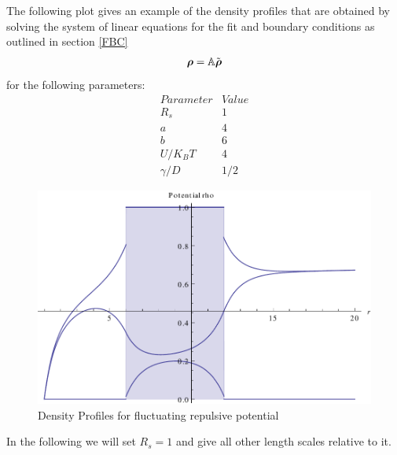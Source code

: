 The following plot gives an example of the density profiles that are obtained by solving the system of linear equations for the fit and boundary conditions as outlined in section \ref{FBC}
\begin{equation}
    \boldsymbol{\mathbf{\rho}} = \mathbb{A} \tilde{\boldsymbol{\mathbf{\rho}}}
\end{equation}
for the following parameters:
\begin{equation}
    \begin{array}{r|l}
        Parameter & Value \\ \hline
        R_s & 1 \\
        a   & 4 \\
        b   & 6 \\
        U/K_B T & 4 \\
        \gamma/D & 1/2
    \end{array} \nonumber
    \label{Parameters}
\end{equation}
\begin{figure}[H]
    \centering
    \includegraphics[width = .9 \textwidth]{plots/rho.pdf}
    \caption{Density Profiles for fluctuating repulsive potential}
    \label{fig:rho}
\end{figure}
In the following we will set $R_s = 1$ and give all other length scales relative to it.
\newpage
